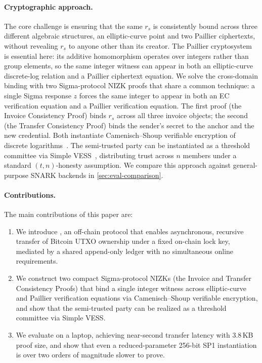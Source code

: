 \paragraph{Cryptographic approach.} The core challenge is ensuring that the same $r_s$ is consistently bound across three different algebraic structures, an elliptic-curve point and two Paillier ciphertexts, without revealing $r_s$ to anyone other than its creator. The Paillier cryptosystem~\cite{paillier1999public} is essential here: its additive homomorphism operates over integers rather than group elements, so the same integer witness can appear in both an elliptic-curve discrete-log relation and a Paillier ciphertext equation. We solve the cross-domain binding with two Sigma-protocol NIZK proofs that share a common technique: a single Sigma response $z$ forces the same integer to appear in both an EC verification equation and a Paillier verification equation. The first proof (the Invoice Consistency Proof) binds $r_s$ across all three invoice objects; the second (the Transfer Consistency Proof) binds the sender's secret to the anchor and the new credential. Both instantiate Camenisch--Shoup verifiable encryption of discrete logarithms~\cite{camenisch2003verifiable}. The semi-trusted party can be instantiated as a threshold committee via Simple VESS~\cite{shoup2024simple}, distributing trust across $n$ members under a standard $(t,n)$-honesty assumption. We compare this approach against general-purpose SNARK backends in \autoref{sec:eval-comparison}.

\paragraph{Contributions.} The main contributions of this paper are:
\begin{enumerate}
  \item We introduce \thunderbolt, an off-chain protocol that enables asynchronous, recursive transfer of Bitcoin UTXO ownership under a fixed on-chain lock key, mediated by a shared append-only ledger with no simultaneous online requirements.
  \item We construct two compact Sigma-protocol NIZKs (the Invoice and Transfer Consistency Proofs) that bind a single integer witness across elliptic-curve and Paillier verification equations via Camenisch--Shoup verifiable encryption, and show that the semi-trusted party can be realized as a threshold committee via Simple VESS.
  \item We evaluate \thunderbolt on a laptop, achieving near-second transfer latency with 3.8\,KB proof size, and show that even a reduced-parameter 256-bit SP1 instantiation is over two orders of magnitude slower to prove.
\end{enumerate}

